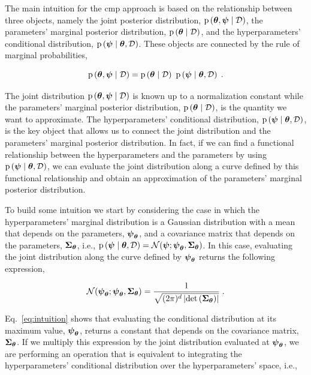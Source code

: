 \smallskip
The main intuition for the \gls{cmp} approach is based on the relationship between three objects, namely the joint posterior distribution, $\mathrm{p} \left( \boldsymbol{\theta}, \boldsymbol{\psi} \mid \mathcal{D} \right)$, the parameters' marginal posterior distribution, $\mathrm{p} \left( \boldsymbol{\theta} \mid \mathcal{D} \right)$, and the hyperparameters' conditional distribution, $\mathrm{p} \left( \boldsymbol{\psi} \mid \boldsymbol{\theta}, \mathcal{D} \right)$. These objects are connected by the rule of marginal probabilities,

\begin{equation}
    \mathrm{p} \left( \boldsymbol{\theta}, \boldsymbol{\psi} \mid \mathcal{D} \right) = \mathrm{p} \left( \boldsymbol{\theta} \mid \mathcal{D} \right) \ \mathrm{p} \left( \boldsymbol{\psi} \mid \boldsymbol{\theta}, \mathcal{D} \right) \;.
    \label{eq:cmp:hpar_posterior}
\end{equation}

The joint distribution $\mathrm{p} \left( \boldsymbol{\theta}, \boldsymbol{\psi} \mid \mathcal{D} \right)$ is known up to a normalization constant while the parameters' marginal posterior distribution, $\mathrm{p} \left( \boldsymbol{\theta} \mid \mathcal{D} \right)$, is the quantity we want to approximate. The hyperparameters' conditional distribution, $\mathrm{p} \left( \boldsymbol{\psi} \mid \boldsymbol{\theta}, \mathcal{D} \right)$, is the key object that allows us to connect the joint distribution and the parameters' marginal posterior distribution. In fact, if we can find a functional relationship between the hyperparameters and the parameters by using $\mathrm{p} \left( \boldsymbol{\psi} \mid \boldsymbol{\theta}, \mathcal{D} \right)$, we can evaluate the joint distribution along a curve defined by this functional relationship and obtain an approximation of the parameters' marginal posterior distribution.

\smallskip
To build some intuition we start by considering the case in which the hyperparameters' marginal distribution is a Gaussian distribution with a mean that depends on the parameters, $\boldsymbol{\psi}_{\boldsymbol{\theta}}$, and a covariance matrix that depends on the parameters, $\boldsymbol{\Sigma}_{\boldsymbol{\theta}}$, i.e., $\mathrm{p} \left( \boldsymbol{\psi} \mid \boldsymbol{\theta}, \mathcal{D} \right) = \mathcal{N}(\boldsymbol{\psi}; \boldsymbol{\psi}_{\boldsymbol{\theta}}, \boldsymbol{\Sigma}_{\boldsymbol{\theta}})$. In this case, evaluating the joint distribution along the curve defined by $\boldsymbol{\psi}_{\boldsymbol{\theta}}$ returns the following expression,

\begin{equation}
    \mathcal{N}(\boldsymbol{\psi}_{\boldsymbol{\theta}}; \boldsymbol{\psi}_{\boldsymbol{\theta}}, \boldsymbol{\Sigma}_{\boldsymbol{\theta}})  = \dfrac{1}{\sqrt{(2\pi)^d \left| \mathrm{det}\left(\boldsymbol{\Sigma}_{\boldsymbol{\theta}}\right) \right|}} \;.
    \label{eq:intuition}
\end{equation}

Eq.~\eqref{eq:intuition} shows that evaluating the conditional distribution at its maximum value, $\boldsymbol{\psi}_{\boldsymbol{\theta}}$, returns a constant that depends on the covariance matrix, $\boldsymbol{\Sigma}_{\boldsymbol{\theta}}$. If we multiply this expression by the joint distribution evaluated at $\boldsymbol{\psi}_{\boldsymbol{\theta}}$, we are performing an operation that is equivalent to integrating the hyperparameters' conditional distribution over the hyperparameters' space, i.e.,

